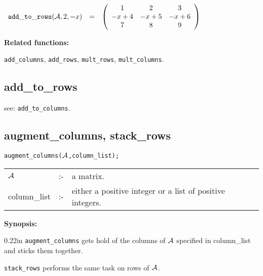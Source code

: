 \vspace*{0.1in}

\begin{flushleft}
\hspace*{0.175in}
\begin{math}
\begin{array}{ccc}
{\tt add\_to\_rows}({\cal A},2,-x) & = &
\left( \begin{array}{ccc} 1 & 2 & 3 \\ -x+4 & -x+5 & -x+6 \\ 7 & 8 & 9
\end{array} \right)
\end{array}
\end{math}
\end{flushleft}

{\bf Related functions:}

\hspace*{0.175in}
{\tt add\_columns}, {\tt add\_rows}, {\tt mult\_rows},
{\tt mult\_columns}.


\subsection{add\_to\_rows}

\hspace*{0.175in} see: {\tt add\_to\_columns}.


\subsection{augment\_columns, stack\_rows}


\hspace*{0.175in} {\tt augment\_columns(${\cal A}$,column\_list);}

\hspace*{0.1in}
\begin{tabular}{l l l}
${\cal A}$  &:-& a matrix. \\
column\_list &:-&  either a positive integer or a list of positive
                   integers.
\end{tabular}

{\bf Synopsis:} %

\begin{addtolength}{\leftskip}{0.22in}
{\tt augment\_columns} gets hold of the columns of ${\cal A}$ specified
in column\_list and sticks them together.

{\tt stack\_rows} performs the same task on rows of
                ${\cal A}$.

\end{addtolength}

